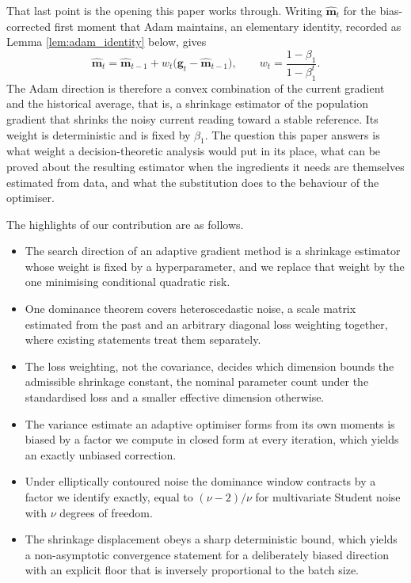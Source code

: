 \documentclass[pdflatex,sn-mathphys-num]{sn-jnl}%
\theoremstyle{thmstyleone}%
\theoremstyle{thmstyletwo}%
\theoremstyle{thmstylethree}%
\begin{document}
That last point is the opening this paper works through. Writing $\hat{\bm m}_t$ for the bias-corrected first moment that Adam maintains, an elementary identity, recorded as Lemma \ref{lem:adam_identity} below, gives
\begin{equation}
\label{eq:adam_convex}
\hat{\bm m}_t
=
\hat{\bm m}_{t-1}
+
w_t\bigl(\bm g_t-\hat{\bm m}_{t-1}\bigr),
\qquad
w_t=\frac{1-\beta_1}{1-\beta_1^{t}} .
\end{equation}
The Adam direction is therefore a convex combination of the current gradient and the historical average, that is, a shrinkage estimator of the population gradient that shrinks the noisy current reading toward a stable reference. Its weight is deterministic and is fixed by $\beta_1$. The question this paper answers is what weight a decision-theoretic analysis would put in its place, what can be proved about the resulting estimator when the ingredients it needs are themselves estimated from data, and what the substitution does to the behaviour of the optimiser.

The highlights of our contribution are as follows. 
\begin{itemize}

\item The search direction of an adaptive gradient method is a shrinkage estimator whose weight is fixed by a hyperparameter, and we replace that weight by the one minimising conditional quadratic risk.

\item One dominance theorem covers heteroscedastic noise, a scale matrix estimated from the past and an arbitrary diagonal loss weighting together, where existing statements treat them separately.

\item The loss weighting, not the covariance, decides which dimension bounds the admissible shrinkage constant, the nominal parameter count under the standardised loss and a smaller effective dimension otherwise.

\item The variance estimate an adaptive optimiser forms from its own moments is biased by a factor we compute in closed form at every iteration, which yields an exactly unbiased correction.

\item Under elliptically contoured noise the dominance window contracts by a factor we identify exactly, equal to $(\nu-2)/\nu$ for multivariate Student noise with $\nu$ degrees of freedom.

\item The shrinkage displacement obeys a sharp deterministic bound, which yields a non-asymptotic convergence statement for a deliberately biased direction with an explicit floor that is inversely proportional to the batch size.

\end{itemize}
\end{document}
